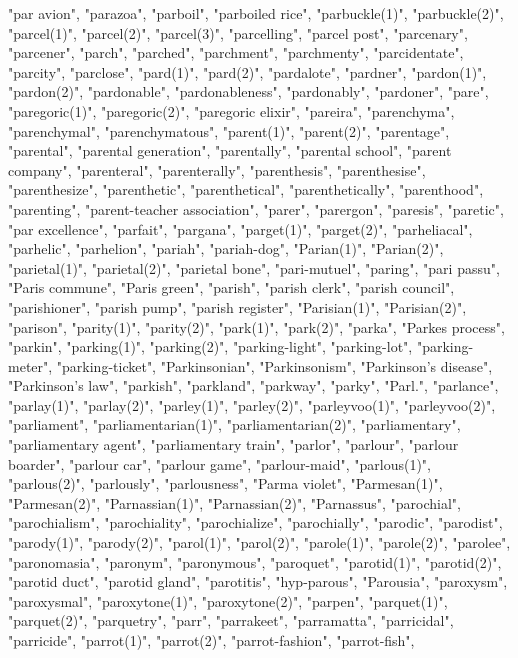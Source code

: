 "par avion",
"parazoa",
"parboil",
"parboiled rice",
"parbuckle(1)",
"parbuckle(2)",
"parcel(1)",
"parcel(2)",
"parcel(3)",
"parcelling",
"parcel post",
"parcenary",
"parcener",
"parch",
"parched",
"parchment",
"parchmenty",
"parcidentate",
"parcity",
"parclose",
"pard(1)",
"pard(2)",
"pardalote",
"pardner",
"pardon(1)",
"pardon(2)",
"pardonable",
"pardonableness",
"pardonably",
"pardoner",
"pare",
"paregoric(1)",
"paregoric(2)",
"paregoric elixir",
"pareira",
"parenchyma",
"parenchymal",
"parenchymatous",
"parent(1)",
"parent(2)",
"parentage",
"parental",
"parental generation",
"parentally",
"parental school",
"parent company",
"parenteral",
"parenterally",
"parenthesis",
"parenthesise",
"parenthesize",
"parenthetic",
"parenthetical",
"parenthetically",
"parenthood",
"parenting",
"parent-teacher association",
"parer",
"parergon",
"paresis",
"paretic",
"par excellence",
"parfait",
"pargana",
"parget(1)",
"parget(2)",
"parheliacal",
"parhelic",
"parhelion",
"pariah",
"pariah-dog",
"Parian(1)",
"Parian(2)",
"parietal(1)",
"parietal(2)",
"parietal bone",
"pari-mutuel",
"paring",
"pari passu",
"Paris commune",
"Paris green",
"parish",
"parish clerk",
"parish council",
"parishioner",
"parish pump",
"parish register",
"Parisian(1)",
"Parisian(2)",
"parison",
"parity(1)",
"parity(2)",
"park(1)",
"park(2)",
"parka",
"Parkes process",
"parkin",
"parking(1)",
"parking(2)",
"parking-light",
"parking-lot",
"parking-meter",
"parking-ticket",
"Parkinsonian",
"Parkinsonism",
"Parkinson's disease",
"Parkinson's law",
"parkish",
"parkland",
"parkway",
"parky",
"Parl.",
"parlance",
"parlay(1)",
"parlay(2)",
"parley(1)",
"parley(2)",
"parleyvoo(1)",
"parleyvoo(2)",
"parliament",
"parliamentarian(1)",
"parliamentarian(2)",
"parliamentary",
"parliamentary agent",
"parliamentary train",
"parlor",
"parlour",
"parlour boarder",
"parlour car",
"parlour game",
"parlour-maid",
"parlous(1)",
"parlous(2)",
"parlously",
"parlousness",
"Parma violet",
"Parmesan(1)",
"Parmesan(2)",
"Parnassian(1)",
"Parnassian(2)",
"Parnassus",
"parochial",
"parochialism",
"parochiality",
"parochialize",
"parochially",
"parodic",
"parodist",
"parody(1)",
"parody(2)",
"parol(1)",
"parol(2)",
"parole(1)",
"parole(2)",
"parolee",
"paronomasia",
"paronym",
"paronymous",
"paroquet",
"parotid(1)",
"parotid(2)",
"parotid duct",
"parotid gland",
"parotitis",
"hyp-parous",
"Parousia",
"paroxysm",
"paroxysmal",
"paroxytone(1)",
"paroxytone(2)",
"parpen",
"parquet(1)",
"parquet(2)",
"parquetry",
"parr",
"parrakeet",
"parramatta",
"parricidal",
"parricide",
"parrot(1)",
"parrot(2)",
"parrot-fashion",
"parrot-fish",
